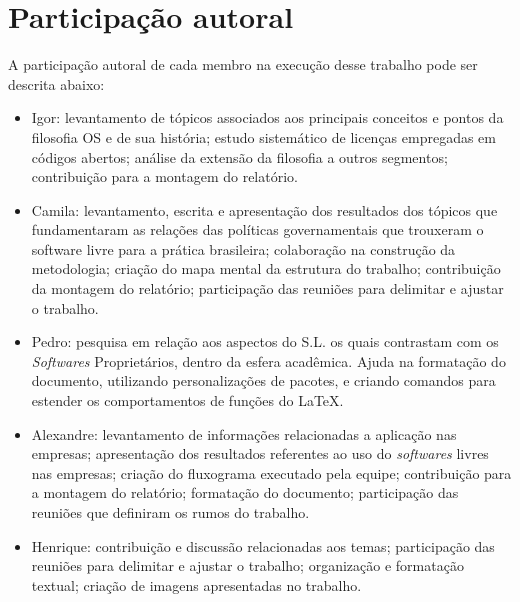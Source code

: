 \documentclass[12pt]{article}
\begin{document}
\section{Participação autoral}

A participação autoral de cada membro na execução desse trabalho pode ser descrita abaixo:

\begin{itemize}
\item Igor: levantamento de tópicos associados aos principais conceitos e pontos da filosofia OS e de sua história; estudo sistemático de licenças empregadas em códigos abertos; análise da extensão da filosofia a outros segmentos; contribuição para a montagem do relatório.

\item Camila: levantamento, escrita e apresentação dos resultados dos tópicos que fundamentaram as relações das políticas governamentais que trouxeram o software livre para a prática brasileira; colaboração na construção da metodologia; criação do mapa mental da estrutura do trabalho; contribuição da montagem do relatório; participação das reuniões para delimitar e ajustar o trabalho.

\item Pedro: pesquisa em relação aos aspectos do S.L. os quais contrastam com os \textit{Softwares} Proprietários, dentro da esfera acadêmica. Ajuda na formatação do documento, utilizando personalizações de pacotes, e criando comandos para estender os comportamentos de funções do \LaTeX.

\item Alexandre: levantamento de informações relacionadas a aplicação nas empresas; apresentação dos resultados referentes ao uso do \textit{softwares} livres nas empresas; criação do fluxograma executado pela equipe; contribuição para a montagem do relatório; formatação do documento; participação das reuniões que definiram os rumos do trabalho.

\item Henrique: contribuição e discussão relacionadas aos temas; participação das reuniões para delimitar e ajustar o trabalho; organização e formatação textual; criação de imagens apresentadas no trabalho.
\end{itemize}


\clearpage









\end{document}
